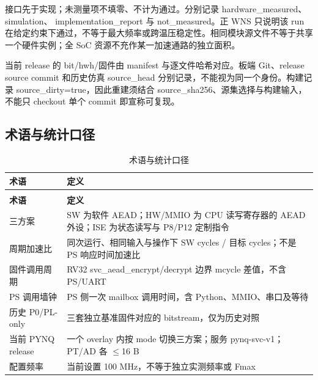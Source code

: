 接口先于实现；未测量项不填零、不计为通过。分别记录 hardware\_measured、simulation、 implementation\_report 与 not\_measured。正 WNS 只说明该 run 在给定约束下通过，不等于最大频率或跨温压稳定性。相同模块源文件不等于共享一个硬件实例；全 SoC 资源不充作某一加速通路的独立面积。

当前 release 的 bit/hwh/固件由 manifest 与逐文件哈希对应。板端 Git、release source commit 和历史仿真 source\_head 分别记录，不能视为同一个身份。构建记录 source\_dirty=true，因此重建须结合 source\_sha256、源集选择与构建输入，不能只 checkout 单个 commit 即宣称可复现。

\Needspace{85pt}

\subsection{术语与统计口径}

{\small
\renewcommand{\thetable}{D-2}
\begin{longtable}{@{}>{\raggedright\arraybackslash}p{}>{\raggedright\arraybackslash}p{}@{}}
\caption{术语与统计口径}\label{tab:D-2}\\
\toprule
\textbf{术语} & \textbf{定义} \\
\midrule
\endfirsthead
\multicolumn{2}{@{}l}{\footnotesize 续表 D-2}\\
\toprule
\textbf{术语} & \textbf{定义} \\
\midrule
\endhead
三方案 & SW 为软件 AEAD；HW/MMIO 为 CPU 读写寄存器的 AEAD 外设；ISE 为状态读写与 P8/P12 定制指令 \\
周期加速比 & 同次运行、相同输入与操作下 SW cycles / 目标 cycles；不是 PS 响应时间加速比 \\
固件调用周期 & RV32 svc\_\allowbreak{}aead\_\allowbreak{}encrypt/\allowbreak{}decrypt 边界 mcycle 差值，不含 PS/UART \\
PS 调用墙钟 & PS 侧一次 mailbox 调用时间，含 Python、MMIO、串口及等待 \\
历史 P0/PL-only & 三套独立基准固件对应的 bitstream，仅为历史对照 \\
当前 PYNQ release & 一个 overlay 内按 mode 切换三方案；服务 pynq-svc-v1；PT/AD 各 $\leq$16 B \\
配置频率 & 当前设置 100 MHz，不等于独立实测频率或 Fmax \\
\bottomrule
\end{longtable}
}

